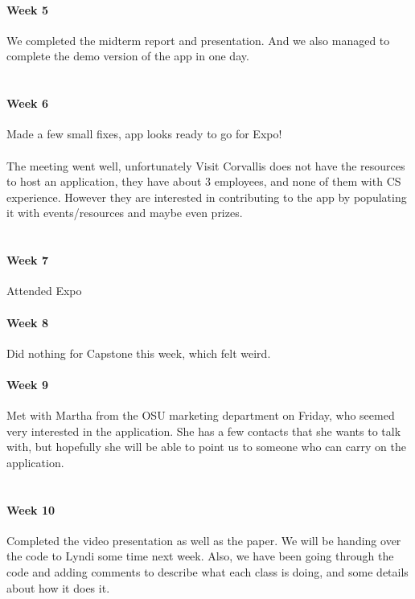 \documentclass[onecolumn, draftclsnofoot,10pt, compsoc]{IEEEtran}
\begin{document}
      \paragraph{Week 5}
      We completed the midterm report and presentation. And we also managed to complete the demo version of the app in one day. \\ \\

      \paragraph{Week 6}
      Made a few small fixes, app looks ready to go for Expo! \\ \\
      The meeting went well, unfortunately Visit Corvallis does not have the resources to host an application, they have about 3 employees, and none of them with CS experience. However they are interested in contributing to the app by populating it with events/resources and maybe even prizes. \\ \\

      \paragraph{Week 7}
      Attended Expo

      \paragraph{Week 8}
      Did nothing for Capstone this week, which felt weird.

      \paragraph{Week 9}
      Met with Martha from the OSU marketing department on Friday, who seemed very interested in the application. She has a few contacts that she wants to talk with, but hopefully she will be able to point us to someone who can carry on the application. \\ \\

      \paragraph{Week 10}
      Completed the video presentation as well as the paper. We will be handing over the code to Lyndi some time next week. Also, we have been going through the code and adding comments to describe what each class is doing, and some details about how it does it. \\ \\
\end{document}
